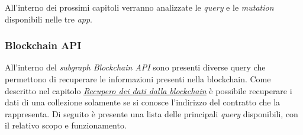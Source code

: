 All'interno dei prossimi capitoli verranno analizzate le \textit{query} e le \textit{mutation} disponibili nelle tre \textit{app}.

\subsubsection{Blockchain API}

All'interno del \textit{subgraph Blockchain API} sono presenti diverse query che permettono di recuperare le informazioni presenti nella blockchain. Come descritto nel capitolo \hyperref[sec:recuperoDatiBlockchain]{\textit{Recupero dei dati dalla blockchain}} è possibile recuperare i dati di una collezione solamente se si conosce l'indirizzo del contratto che la rappresenta.
Di seguito è presente una lista delle principali \textit{query} disponibili, con il relativo scopo e funzionamento.

